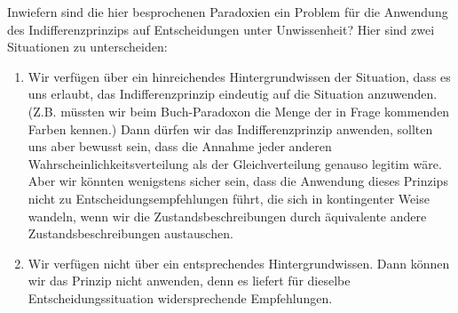 Inwiefern sind die hier besprochenen Paradoxien ein Problem für die Anwendung des
Indifferenzprinzips auf Entscheidungen unter Unwissenheit?
 Hier sind zwei Situationen zu
unterscheiden:

\begin{enumerate}
 
  \item Wir verfügen über ein hinreichendes Hintergrundwissen der Situation,
  dass es uns erlaubt, das Indifferenzprinzip eindeutig auf die Situation
  anzuwenden. (Z.B. müssten wir beim Buch-Paradoxon die Menge der in Frage
  kommenden Farben kennen.) Dann dürfen wir das Indifferenzprinzip anwenden,
  sollten uns aber bewusst sein, dass die Annahme jeder anderen
  Wahrscheinlichkeitsverteilung als der Gleichverteilung genauso legitim wäre.
  Aber wir könnten wenigstens sicher sein, dass die Anwendung dieses Prinzips
  nicht zu Entscheidungsempfehlungen führt, die sich in kontingenter
  Weise wandeln, wenn
  wir die Zustandsbeschreibungen durch äquivalente andere
  Zustandsbeschreibungen austauschen.

  \item Wir verfügen nicht über ein entsprechendes Hintergrundwissen. Dann
  können wir das Prinzip nicht anwenden, denn es liefert für dieselbe
  Entscheidungssituation widersprechende Empfehlungen. 
 
\end{enumerate}



